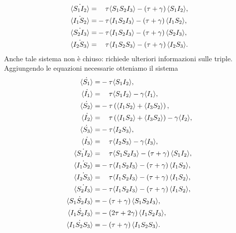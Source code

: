 \begin{equation*}
\begin{aligned}
	\dot{\angol{S_1I_2}}=&\spa\tau\angol{S_1S_2I_3} - \tonde{ \tau + \gamma}\angol{S_1 I_2},
\\
	\dot{\angol{I_1S_2}}=&-\tau\angol{I_1S_2I_3} - \tonde{ \tau + \gamma}\angol{I_1 S_2},
\\
	\dot{\angol{S_2I_3}}=&-\tau\angol{I_1S_2I_3} - \tonde{ \tau + \gamma}\angol{S_2 I_3},
\\
	\dot{\angol{I_2S_3}}=&\spa\tau\angol{I_1S_2S_3} - \tonde{ \tau + \gamma}\angol{I_2 S_3}.
	\end{aligned}
\end{equation*}
Anche tale sistema non \`e chiuso: richiede  ulteriori informazioni sulle triple.\\
Aggiungendo le equazioni necessarie otteniamo il sistema 
\begin{equation}
\label{3nodi}
\begin{aligned}
	\dot{\angol {S_1}} =& -\tau \angol{ S_1 I_2},
\\ 
	\dot{\angol {I_1}} =&\spa \tau \angol{ S_1 I_2}-\gamma \angol{I_1}, 
\\ 
	\dot{\angol {S_2}} = & -\tau \tonde{ \angol{ I_1 S_2}+ \angol{I_3S_2}},
\\
	\dot{\angol {I_2}} = &\spa \tau \tonde{ \angol{ I_1 S_2} + \angol{I_3S_2}}-\gamma \angol{I_2}, 
\\ 
	\dot{\angol {S_3}} = & -\tau \angol{ I_2 S_3},
\\
	\dot{\angol {I_3}} = & \spa \tau  \angol{ I_2 S_3}-\gamma \angol{I_3},	
\\
	\dot{\angol{S_1I_2}}=& \spa\tau\angol{S_1S_2I_3} - \tonde{ \tau + \gamma}\angol{S_1 I_2},
\\
	\dot{\angol{I_1S_2}}=&-\tau\angol{I_1S_2I_3} - \tonde{ \tau + \gamma}\angol{I_1 S_2},
\\ 
	\dot{\angol{I_2S_3}}=&\spa\tau\angol{I_1S_2I_3} - \tonde{ \tau + \gamma}\angol{I_1 S_2},
\\
	\dot{\angol{S_2I_3}}=&-\tau\angol{I_1S_2I_3} - \tonde{ \tau + \gamma}\angol{I_1 S_2},
\\
	\dot{\angol{S_1S_2I_3}}=&-\tonde{\tau + \gamma}\angol{S_1S_2I_3},
\\
	\dot{\angol{I_1S_2I_3}}=&-\tonde{2\tau + 2\gamma}\angol{I_1S_2I_3},
\\
	\dot{\angol{I_1S_2S_3}}=&-\tonde{\tau + \gamma}\angol{I_1S_2S_3}.
 \end{aligned}
\end{equation}
